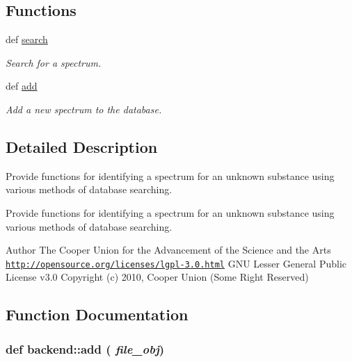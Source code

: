 \subsection*{Functions}
\begin{DoxyCompactItemize}
\item 
def \hyperlink{namespacebackend_af7a9bbf936ca6c76342679bb4a3509cd}{search}
\begin{DoxyCompactList}\small\item\em Search for a spectrum. \item\end{DoxyCompactList}\item 
def \hyperlink{namespacebackend_a31148baaaad7ef57779210d868d99ad7}{add}
\begin{DoxyCompactList}\small\item\em Add a new spectrum to the database. \item\end{DoxyCompactList}\end{DoxyCompactItemize}


\subsection{Detailed Description}
Provide functions for identifying a spectrum for an unknown substance using various methods of database searching. \begin{DoxyVerb}Provide functions for identifying a spectrum for an unknown substance using
various methods of database searching.\end{DoxyVerb}


\begin{DoxyAuthor}{Author}
The Cooper Union for the Advancement of the Science and the Arts  \href{http://opensource.org/licenses/lgpl-3.0.html}{\tt http://opensource.org/licenses/lgpl-\/3.0.html} GNU Lesser General Public License v3.0  Copyright (c) 2010, Cooper Union (Some Right Reserved) 
\end{DoxyAuthor}


\subsection{Function Documentation}
\hypertarget{namespacebackend_a31148baaaad7ef57779210d868d99ad7}{
\subsubsection[{add}]{\setlength{\rightskip}{0pt plus 5cm}def backend::add ( {\em file\_\-obj})}}
\label{namespacebackend_a31148baaaad7ef57779210d868d99ad7}


